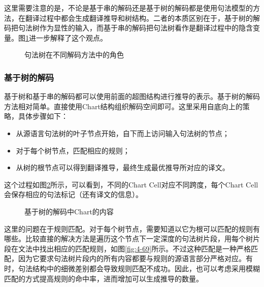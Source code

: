 \parinterval 这里需要注意的是，不论是基于串的解码还是基于树的解码都是使用句法模型的方法，在翻译过程中都会生成翻译推导和树结构。二者的本质区别在于，基于树的解码把句法树作为显性的输入，而基于串的解码把句法树看作是翻译过程中的隐含变量。图\ref{fig:4-67}进一步解释了这个观点。

\begin{figure}[htp]
\centering

\caption{句法树在不同解码方法中的角色}
\label{fig:4-67}
\end{figure}


\subsubsection{基于树的解码}

\parinterval 基于树和基于串的解码都可以使用前面的超图结构进行推导的表示。基于树的解码方法相对简单。直接使用Chart结构组织解码空间即可。这里采用自底向上的策略，具体步骤如下：
\begin{itemize}
\vspace{0.5em}
\item 从源语言句法树的叶子节点开始，自下而上访问输入句法树的节点；
\vspace{0.5em}
\item 对于每个树节点，匹配相应的规则；
\vspace{0.5em}
\item 从树的根节点可以得到翻译推导，最终生成最优推导所对应的译文。
\vspace{0.5em}
\end{itemize}

\parinterval 这个过程如图\ref{fig:4-68}所示，可以看到，不同的Chart Cell对应不同跨度，每个Chart Cell会保存相应的句法标记（还有译文的信息）。

\begin{figure}[htp]
\centering

\caption{基于树的解码中Chart的内容}
\label{fig:4-68}
\end{figure}

\parinterval 这里的问题在于规则匹配。对于每个树节点，需要知道以它为根可以匹配的规则有哪些。比较直接的解决方法是遍历这个节点下一定深度的句法树片段，用每个树片段在文法中找出相应的匹配规则，如图\ref{fig:4-69}所示。不过这种匹配是一种严格匹配，因为它要求句法树片段内的所有内容都要与规则的源语言部分严格对应。有时，句法结构中的细微差别都会导致规则匹配不成功。因此，也可以考虑采用模糊匹配的方式提高规则的命中率，进而增加可以生成推导的数量\cite{zhu2011improving}。

